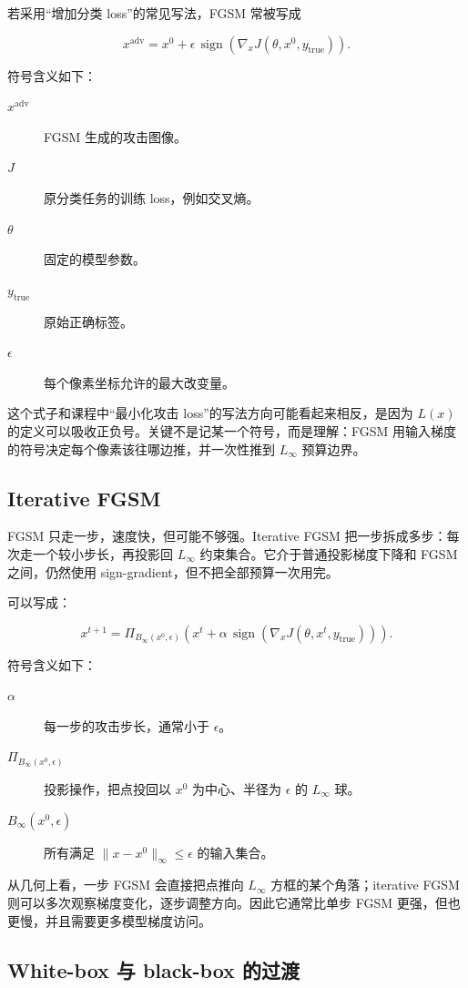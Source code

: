\documentclass[a4paper]{article}
\DeclareMathOperator{\sign}{sign}
\begin{document}
若采用“增加分类 loss”的常见写法，FGSM 常被写成

\[
x^{\mathrm{adv}}=x^0+\epsilon\,\sign(\nabla_x J(\theta,x^0,y_{\mathrm{true}})).
\]

符号含义如下：
\begin{description}
    \item[$x^{\mathrm{adv}}$] FGSM 生成的攻击图像。
    \item[$J$] 原分类任务的训练 loss，例如交叉熵。
    \item[$\theta$] 固定的模型参数。
    \item[$y_{\mathrm{true}}$] 原始正确标签。
    \item[$\epsilon$] 每个像素坐标允许的最大改变量。
\end{description}

这个式子和课程中“最小化攻击 loss”的写法方向可能看起来相反，是因为 $L(x)$ 的定义可以吸收正负号。关键不是记某一个符号，而是理解：FGSM 用输入梯度的符号决定每个像素该往哪边推，并一次性推到 $L_\infty$ 预算边界。

\subsection{Iterative FGSM}

FGSM 只走一步，速度快，但可能不够强。Iterative FGSM 把一步拆成多步：每次走一个较小步长，再投影回 $L_\infty$ 约束集合。它介于普通投影梯度下降和 FGSM 之间，仍然使用 sign-gradient，但不把全部预算一次用完。

可以写成：

\[
x^{t+1}=\Pi_{B_\infty(x^0,\epsilon)}
\left(x^t+\alpha\,\sign(\nabla_x J(\theta,x^t,y_{\mathrm{true}}))\right).
\]

符号含义如下：
\begin{description}
    \item[$\alpha$] 每一步的攻击步长，通常小于 $\epsilon$。
    \item[$\Pi_{B_\infty(x^0,\epsilon)}$] 投影操作，把点投回以 $x^0$ 为中心、半径为 $\epsilon$ 的 $L_\infty$ 球。
    \item[$B_\infty(x^0,\epsilon)$] 所有满足 $\|x-x^0\|_\infty\le\epsilon$ 的输入集合。
\end{description}

从几何上看，一步 FGSM 会直接把点推向 $L_\infty$ 方框的某个角落；iterative FGSM 则可以多次观察梯度变化，逐步调整方向。因此它通常比单步 FGSM 更强，但也更慢，并且需要更多模型梯度访问。

\subsection{White-box 与 black-box 的过渡}
\end{document}
